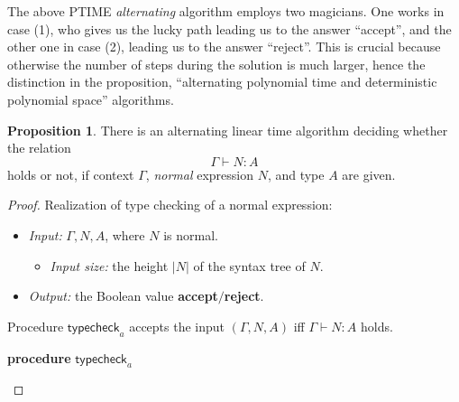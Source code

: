 \documentclass[12pt, titlepage, a4paper]{amsart}
\theoremstyle{definition}
\newtheorem{proposition}{Proposition}
\theoremstyle{theorem}
\theoremstyle{remark}
\begin{document}
The above PTIME \textit{alternating} algorithm employs two magicians. One works in case (1), who gives us the lucky path leading us to the answer “accept”, and the other one in case (2), leading us to the answer “reject”. This is crucial because otherwise the number of steps during the solution is much larger, hence the distinction in the proposition, “alternating polynomial time and deterministic polynomial space” algorithms.
\begin{proposition} There is an alternating linear time algorithm deciding whether the relation 
$$\Gamma\vdash N:A$$ 
holds or not, if context $\Gamma$, \textit{normal} expression $N$, and type $A$ are given.   
\end{proposition}
\begin{proof} Realization of type checking of a normal expression:
\begin{itemize}
\item[] \textit{Input:} $\Gamma, N, A$, where $N$ is normal.
\begin{itemize}
\item[] \textit{Input size:} the height $|N|$ of the syntax tree of $N$.
\end{itemize}
\item[] \textit{Output:} the Boolean value \textbf{accept}$\slash$\textbf{reject}. 
\end{itemize}
Procedure $\mathsf{typecheck}_a$ accepts the input $(\Gamma,N,A)$ iff $\Gamma\vdash N:A$ holds. 

\par \textbf{procedure} $\mathsf{typecheck}_a$
\begin{center}
\end{center}
\end{proof}
\end{document}
